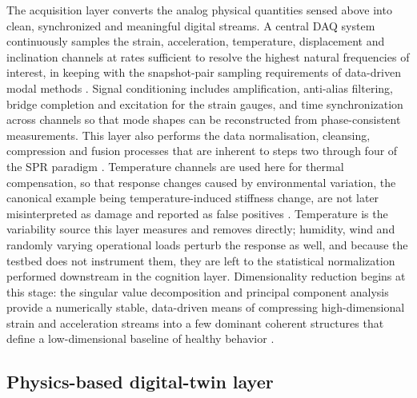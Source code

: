The acquisition layer converts the analog physical quantities sensed above into clean, synchronized and meaningful digital streams. A central DAQ system continuously samples the strain, acceleration, temperature, displacement and inclination channels at rates sufficient to resolve the highest natural frequencies of interest, in keeping with the snapshot-pair sampling requirements of data-driven modal methods \citep{brunton2019data}. Signal conditioning includes amplification, anti-alias filtering, bridge completion and excitation for the strain gauges, and time synchronization across channels so that mode shapes can be reconstructed from phase-consistent measurements. This layer also performs the data normalisation, cleansing, compression and fusion processes that are inherent to steps two through four of the SPR paradigm \citep{farrar2013shm}. Temperature channels are used here for thermal compensation, so that response changes caused by environmental variation, the canonical example being temperature-induced stiffness change, are not later misinterpreted as damage and reported as false positives \citep{farrar2013shm,figueiredo2010machine}. Temperature is the variability source this layer measures and removes directly; humidity, wind and randomly varying operational loads perturb the response as well, and because the testbed does not instrument them, they are left to the statistical normalization performed downstream in the cognition layer. Dimensionality reduction begins at this stage: the singular value decomposition and principal component analysis provide a numerically stable, data-driven means of compressing high-dimensional strain and acceleration streams into a few dominant coherent structures that define a low-dimensional baseline of healthy behavior \citep{brunton2019data}.

\subsection{Physics-based digital-twin layer}\label{subsec:digitaltwin}

